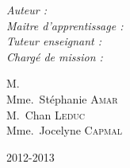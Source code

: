\begin{titlepage}
\begin{center}

\vspace{1cm}
\begin{minipage}[t]{0.4\textwidth}
  \begin{flushleft} \large
    \emph{Auteur : }\\
    \emph{Maitre d'apprentissage : }\\
    \emph{Tuteur enseignant : }\\
    \emph{Chargé de mission : }\\
  \end{flushleft}
\end{minipage}
\begin{minipage}[t]{0.5\textwidth}
  \begin{flushright}  \large
        M.~\reportauthor \\
    Mme.~Stéphanie \textsc{Amar} \\%
    M.~Chan \textsc{Leduc} \\%
    Mme.~Jocelyne \textsc{Capmal}\\
  \end{flushright}
\end{minipage}



\vfill

{\large 2012-2013}

\end{center}

\end{titlepage}
